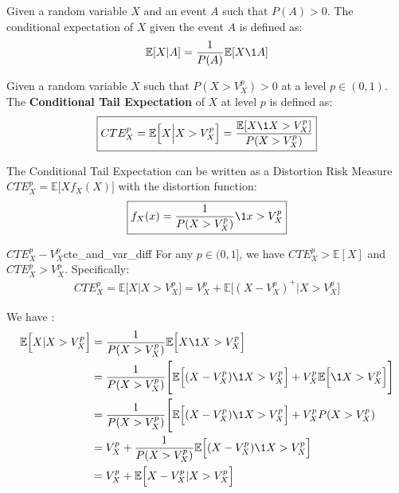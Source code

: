 \begin{definition}
    Given a random variable $X$ and an event $A$ such that $P(A)>0$. The conditional expectation of $X$ given the event $A$ is defined as:
    \begin{align*}
        \mathbb{E}[X|A] = \frac{1}{P(A)}\mathbb{E}[X\1{A}]
    \end{align*}
\end{definition}

\begin{definition}
    Given a random variable $X$ such that $P(X>V_X^p)>0$ at a level $p\in (0,1)$. The \textbf{Conditional Tail Expectation} of $X$ at level $p$ is defined as:
    \begin{align*}
        \boxed{
            CTE_X^p = \mathbb{E}\Big[
                X \Big| X > V_X^p
            \Big] = \frac{\mathbb{E}[X\1{X>V_X^p}]}{P(X>V_X^p)}
        }
    \end{align*}

    \noindent The Conditional Tail Expectation can be written as a Distortion Risk Measure $CTE_X^p=\mathbb{E}\Big[ Xf_X(X)\Big]$ with the distortion function:
    \begin{align*}
        \boxed{
            f_X(x) = \frac{1}{P(X>V_X^p)}\1{x>V_X^p}
        }
    \end{align*}
\end{definition}

\begin{proposition}{$CTE_X^p - V_X^p$}{cte_and_var_diff}
    For any $p\in(0,1]$, we have $CTE_X^p > \mathbb{E}[X]$ and $CTE_X^p > V_X^p$. Specifically:
    \begin{align*}
        CTE_X^p = \mathbb{E}\Big[ X\Big|X>V_X^p \Big] = V_X^p + \mathbb{E}\Big[(X-V_X^p)^+ | X > V_X^p\Big]
    \end{align*}
\end{proposition}

\begin{proof*}
    We have :
    \begin{align*}
        \mathbb{E}\Big[ X | X > V_X^p \Big] 
            &= \frac{1}{P(X>V_X^p)}\mathbb{E}\Big[ X\1{X > V_X^p} \Big] \\
            &= \frac{1}{P(X>V_X^p)}\Bigg[ \mathbb{E}\Big[ (X - V_X^p) \1{X > V_X^p} \Big] + V_X^p\mathbb{E}\Big[ \1{X > V_X^p} \Big] \Bigg] \\
            &= \frac{1}{P(X>V_X^p)}\Bigg[ \mathbb{E}\Big[ (X - V_X^p) \1{X > V_X^p} \Big] + V_X^pP(X>V_X^p) \\
            &= V_X^p + \frac{1}{P(X>V_X^p)} \mathbb{E}\Big[ (X - V_X^p) \1{X > V_X^p} \Big] \\
            &= V_X^p + \mathbb{E}\Big[ X - V_X^p | X > V_X^p \Big]
    \end{align*}
\end{proof*}

